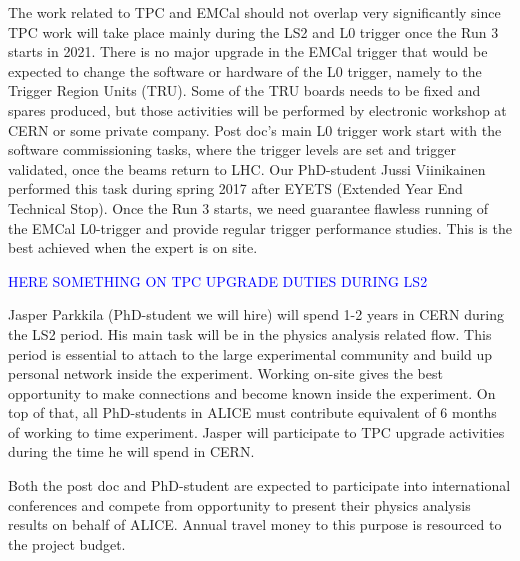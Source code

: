 The work related to TPC and EMCal should not overlap very significantly since TPC work will take place mainly during the LS2 and L0 trigger once the Run 3 starts in 2021. There is no major upgrade in the EMCal trigger that would be expected to change the software or hardware of the L0 trigger, namely to the Trigger Region Units (TRU). Some of the TRU boards needs to be fixed and spares produced, but those activities will be performed by electronic workshop at CERN or some private company. Post doc’s main L0 trigger work start with the software commissioning tasks, where the trigger levels are set and trigger validated, once the beams return to LHC. Our PhD-student Jussi Viinikainen performed this task during spring 2017 after EYETS (Extended Year End Technical Stop). Once the Run 3 starts, we need guarantee flawless running of the EMCal L0-trigger and provide regular trigger performance studies. This is the best achieved when the expert is on site.

\textcolor{blue}{HERE SOMETHING ON TPC UPGRADE DUTIES DURING LS2}

Jasper Parkkila (PhD-student we will hire) will spend 1-2 years in CERN during the LS2 period. His main task will be in the physics analysis related flow. This period is essential to attach to the large experimental community and build up personal network inside the experiment. Working on-site gives the best opportunity to make connections and become known inside the experiment. On top of that, all PhD-students in ALICE must contribute equivalent of 6 months of working to time experiment. Jasper will participate to TPC upgrade activities during the time he will spend in CERN.

Both the post doc and PhD-student are expected to participate into international conferences and compete from opportunity to present their physics analysis results on behalf of ALICE. Annual travel money to this purpose is resourced to the project budget.

\nopagebreak
